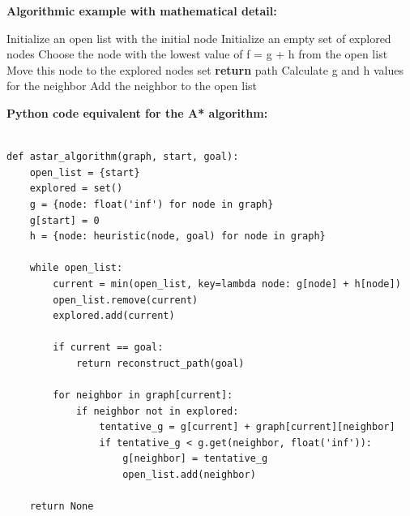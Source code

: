 \documentclass[12pt]{book} %
\begin{document}
\FloatBarrier
\textbf{Algorithmic example with mathematical detail:}
\FloatBarrier
\begin{algorithm}
    \caption{A* Algorithm}
    \begin{algorithmic}[1]
        \State Initialize an open list with the initial node
        \State Initialize an empty set of explored nodes
            \State Choose the node with the lowest value of f = g + h from the open list
            \State Move this node to the explored nodes set
                \State \textbf{return} path
            \EndIf
                    \State Calculate g and h values for the neighbor
                    \State Add the neighbor to the open list
                \EndIf
            \EndFor
        \EndWhile
    \end{algorithmic}
\end{algorithm}
\FloatBarrier
\textbf{Python code equivalent for the A* algorithm:}
\FloatBarrier
\begin{lstlisting}

def astar_algorithm(graph, start, goal):
    open_list = {start}
    explored = set()
    g = {node: float('inf') for node in graph}
    g[start] = 0
    h = {node: heuristic(node, goal) for node in graph}

    while open_list:
        current = min(open_list, key=lambda node: g[node] + h[node])
        open_list.remove(current)
        explored.add(current)

        if current == goal:
            return reconstruct_path(goal)

        for neighbor in graph[current]:
            if neighbor not in explored:
                tentative_g = g[current] + graph[current][neighbor]
                if tentative_g < g.get(neighbor, float('inf')):
                    g[neighbor] = tentative_g
                    open_list.add(neighbor)

    return None
    \end{lstlisting}
\FloatBarrier
\end{document}
